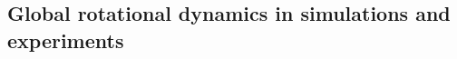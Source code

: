 \documentclass[pre,aps,floatfix,authordate1-4,twocolumn]{revtex4-1}
\begin{document}

\subsection{Global rotational dynamics in simulations and experiments}
\end{document}
